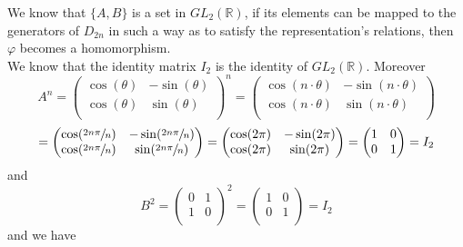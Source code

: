 \documentclass[12pt]{article}
\newcommand{\R}{\mathbb{R}}
\begin{document}
\begin{enumerate}[label=\textbf{\alph*.}]
            We know that $\{A, B\}$ is a set in $GL_2(\R)$,
            if its elements can be mapped to the generators of $D_{2n}$
            in such a way as to satisfy the representation's relations,
            then $\varphi$ becomes a homomorphism. \\ 
            We know that the identity matrix $I_2$ is the identity of
            $GL_2(\R)$.
            Moreover
            \[ A^n = \begin{pmatrix}
                \cos(\theta) & -\sin(\theta) \\
                \cos(\theta) & \sin(\theta) \\
            \end{pmatrix}^n
            = \begin{pmatrix}
                \cos(n \cdot \theta) & -\sin(n \cdot \theta) \\
                \cos(n \cdot \theta) & \sin(n \cdot \theta) \\
            \end{pmatrix} \]
            \[ = \begin{pmatrix}
                \cos(\sfrac{2n \pi}{n}) & -\sin(\sfrac{2n \pi}{n}) \\
                \cos(\sfrac{2n \pi}{n}) & \sin(\sfrac{2n \pi}{n}) \\
            \end{pmatrix} 
             = \begin{pmatrix}
                \cos(2\pi) & -\sin(2\pi) \\
                \cos(2\pi) & \sin(2\pi) \\
            \end{pmatrix}
            = \begin{pmatrix}
                1 & 0 \\
                0 & 1 \\
            \end{pmatrix} = I_2 \]
            and
            \[ B^2 = \begin{pmatrix}
                0 & 1 \\
                1 & 0 \\
            \end{pmatrix}^2 
            =  \begin{pmatrix}
                1 & 0 \\
                0 & 1 \\
            \end{pmatrix} = I_2 \] 
            and we have

\end{enumerate}
\end{document}
